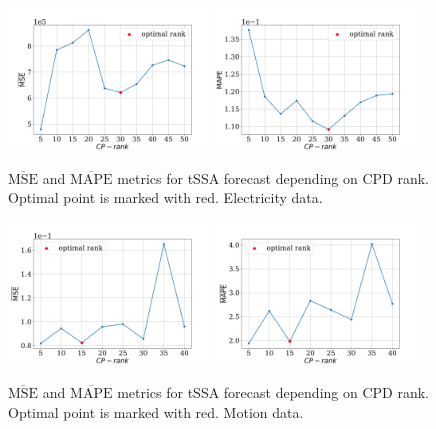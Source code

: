 \documentclass[referee, pdflatex]{sn-jnl}
\theoremstyle{definition}
\theoremstyle{plain}
\begin{document}
	\begin{figure}[h]
		\centering
		\includegraphics[width=0.48\textwidth, keepaspectratio]{../../experiments/electricity/tssa/figs/prediction/MSE_rank.png}
		\includegraphics[width=0.48\textwidth, keepaspectratio]{../../experiments/electricity/tssa/figs/prediction/MAPE_rank.png}
		\caption{$ \overline{\text{MSE}} $ and $ \overline{\text{MAPE}} $ metrics for tSSA forecast depending on CPD rank. Optimal point is marked with red. Electricity data.}\label{fig:mse_mape_electr}
	\end{figure}
	
	\begin{figure}[h]
		\centering
		\includegraphics[width=0.48\textwidth, keepaspectratio]{../../experiments/motion/tssa/figs/prediction/MSE_rank.png}
		\includegraphics[width=0.48\textwidth, keepaspectratio]{../../experiments/motion/tssa/figs/prediction/MAPE_rank.png}
		\caption{$ \overline{\text{MSE}} $ and $ \overline{\text{MAPE}} $ metrics for tSSA forecast depending on CPD rank. Optimal point is marked with red. Motion data.}\label{fig:mse_mape_motion}
	\end{figure}
	
\end{document}
